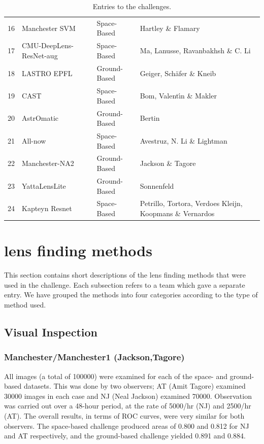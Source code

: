 \documentclass[useAMS,usenatbib]{mnras}
\begin{document}
\begin{table}
\begin{tabular}{rlll}
  16 & Manchester SVM & Space-Based &  Hartley  \& Flamary\\ 
  17 & CMU-DeepLens-ResNet-aug & Space-Based & Ma,  Lanusse, Ravanbakhsh \& C. Li \\ 
  18 & LASTRO EPFL & Ground-Based & Geiger, Sch\"{a}fer \& Kneib   \\ 
  19 & CAST & Space-Based & Bom, Valent\'{\i}n \& Makler  \\ 
  20 & AstrOmatic & Ground-Based & Bertin  \\ 
  21 & All-now & Space-Based & Avestruz, N. Li \& Lightman   \\ 
  22 & Manchester-NA2 & Ground-Based & Jackson \& Tagore  \\ 
  23 & YattaLensLite & Ground-Based & Sonnenfeld   \\ 
  24 & Kapteyn Resnet & Space-Based & Petrillo, Tortora, Verdoes Kleijn, Koopmans \& Vernardos \\ 
   \hline
\end{tabular}
\caption{Entries to the challenges.}
\label{table:entries}
\end{table}

\section{lens finding methods}
\label{sec:methods}

This section contains short descriptions of the lens finding methods that were used in 
the challenge.  Each subsection refers to a team which gave a separate entry.  We have grouped the 
methods into four categories according to the type of method used.

\subsection{Visual Inspection}
\subsubsection{Manchester/Manchester1 (Jackson,Tagore)}

All images (a total of 100000) were examined for each of the space- and
ground-based datasets. This was done by two observers; AT (Amit Tagore) examined 30000
images in each case and NJ (Neal Jackson) examined 70000. Observation was carried out
over a 48-hour period, at the rate of 5000/hr (NJ) and 2500/hr (AT). 
The overall results, in terms of ROC curves, were very similar for 
both observers. The space-based challenge produced areas of 0.800 and 
0.812 for NJ and AT respectively, and the ground-based challenge yielded 
0.891 and 0.884.
\end{document}
